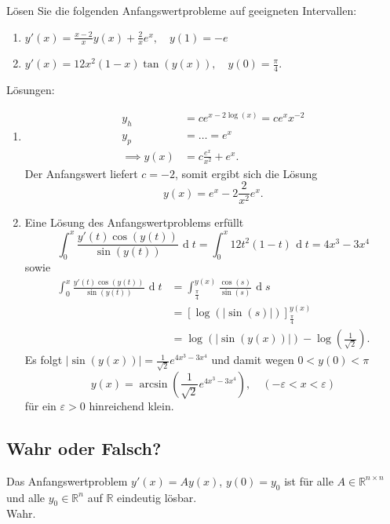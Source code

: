 \documentclass[parskip=full]{scrartcl}
\DeclareMathOperator{\diff}{\mathop{}\!\mathrm{d}}
\begin{document}
Lösen Sie die folgenden Anfangswertprobleme auf geeigneten Intervallen:
\begin{enumerate}
    \item $y'(x) = \frac{x - 2}{x} y(x) + \frac{2}{x}e^x, \quad y(1) = -e$
    \item $y'(x) = 12x^2(1 - x) \tan(y(x)), \quad y(0) = \frac{\pi}{4}$.
\end{enumerate}
Lösungen:
\begin{enumerate}
    \item 
    \begin{align*}
      y_h &= ce^{x - 2\log(x)} = ce^x x^{-2}\\
      y_p &= \dots = e^x\\
      \implies y(x) &= c\frac{e^x}{x^2} + e^x.
    \end{align*}
    Der Anfangswert liefert $c = -2$, somit ergibt sich die Lösung
\begin{displaymath}
  y(x) = e^x - 2\frac{2}{x^2}e^x.
\end{displaymath}
  \item
  Eine Lösung des Anfangswertproblems erfüllt
  \begin{displaymath}
    \int_0^x \frac{y'(t) \cos(y(t))}{\sin(y(t))} \diff t = \int_0^x 12t^2(1 - t) \diff t = 4x^3 - 3x^4 
  \end{displaymath}
  sowie
  \begin{align*}
    \int_0^x \frac{y'(t) \cos(y(t))}{\sin(y(t))} \diff t &= \int_{\frac{\pi}{4}}^{y(x)} \frac{\cos(s)}{\sin(s)} \diff s\\
    &= [\log(|\sin(s)|)]_{\frac{\pi}{4}}^{y(x)}\\
    &= \log(|\sin(y(x))|) - \log\left(\frac{1}{\sqrt{2}}\right).
  \end{align*}
  Es folgt $|\sin(y(x))| = \frac{1}{\sqrt{2}} e^{4x^3 - 3x^4}$ und damit wegen $0 < y(0) < \pi$
  \begin{displaymath}
    y(x) = \arcsin\left(\frac{1}{\sqrt{2}}e^{4x^3 - 3x^4}\right), \quad (-\varepsilon < x < \varepsilon)
  \end{displaymath}
  für ein $\varepsilon > 0$ hinreichend klein.
\end{enumerate}

\subsection{Wahr oder Falsch?}
Das Anfangswertproblem $y'(x) = Ay(x)$, $y(0) = y_0$ ist für alle $A \in \mathbb{R}^{n \times n}$ und alle $y_0 \in \mathbb{R}^n$ auf $\mathbb{R}$ eindeutig lösbar.\\
Wahr.
\end{document}

